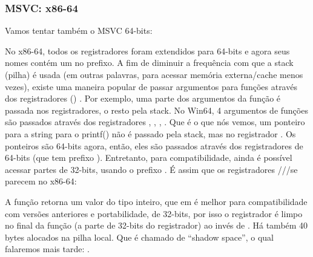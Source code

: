 \subsubsection{MSVC: x86-64}

Vamos tentar também o MSVC 64-bits:




No x86-64, todos os registradores foram extendidos para 64-bits e agora seus nomes contém um  no prefixo.
A fim de diminuir a frequência com que a stack (pilha) é usada (em outras palavras, para acessar memória externa/cache menos vezes),
existe uma maneira popular de passar argumentos para funções através dos registradores () .
Por exemplo, uma parte dos argumentos da função é passada nos registradores, o resto pela stack.
No Win64, 4 argumentos de funções são passados através dos registradores \RCX, \RDX, , .
Que é o que nós vemos, um ponteiro para a string para o printf() não é passado pela stack, mas no registrador \RCX.
Os ponteiros são 64-bits agora, então, eles são passados através dos registradores de 64-bits (que tem prefixo ).
Entretanto, para compatibilidade, ainda é possível acessar partes de 32-bits, usando o prefixo .
É assim que os registradores \RAX/\EAX/\AX/\AL se parecem no x86-64:


A função \main retorna um valor do tipo inteiro, que em \CCpp é melhor para compatibilidade com versões anteriores e portabilidade,
de 32-bits, por isso o registrador \EAX é limpo no final da função (a parte de 32-bits do registrador) ao invés de \RAX.
Há também 40 bytes alocados na pilha local.
Que é chamado de ``shadow space'', o qual falaremos mais tarde: .

